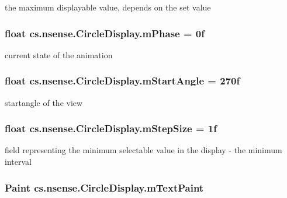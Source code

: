 the maximum displayable value, depends on the set value \hypertarget{classcs_1_1nsense_1_1_circle_display_acd03c2fef87214cee07a6e4616a220a9}{
\subsubsection[{m\-Phase}]{\setlength{\rightskip}{0pt plus 5cm}float cs.\-nsense.\-Circle\-Display.\-m\-Phase = 0f\hspace{0.3cm}{\ttfamily [private]}}}\label{classcs_1_1nsense_1_1_circle_display_acd03c2fef87214cee07a6e4616a220a9}
current state of the animation \hypertarget{classcs_1_1nsense_1_1_circle_display_aea2263400339123d153c5a097a5784de}{
\subsubsection[{m\-Start\-Angle}]{\setlength{\rightskip}{0pt plus 5cm}float cs.\-nsense.\-Circle\-Display.\-m\-Start\-Angle = 270f\hspace{0.3cm}{\ttfamily [private]}}}\label{classcs_1_1nsense_1_1_circle_display_aea2263400339123d153c5a097a5784de}
startangle of the view \hypertarget{classcs_1_1nsense_1_1_circle_display_ae39f44599a59bbcd082589e4f75eaf9f}{
\subsubsection[{m\-Step\-Size}]{\setlength{\rightskip}{0pt plus 5cm}float cs.\-nsense.\-Circle\-Display.\-m\-Step\-Size = 1f\hspace{0.3cm}{\ttfamily [private]}}}\label{classcs_1_1nsense_1_1_circle_display_ae39f44599a59bbcd082589e4f75eaf9f}
field representing the minimum selectable value in the display -\/ the minimum interval \hypertarget{classcs_1_1nsense_1_1_circle_display_ae5dd88ea958c6fe25ff333e3cd04b1f7}{
\subsubsection[{m\-Text\-Paint}]{\setlength{\rightskip}{0pt plus 5cm}Paint cs.\-nsense.\-Circle\-Display.\-m\-Text\-Paint\hspace{0.3cm}{\ttfamily [private]}}}\label{classcs_1_1nsense_1_1_circle_display_ae5dd88ea958c6fe25ff333e3cd04b1f7}
